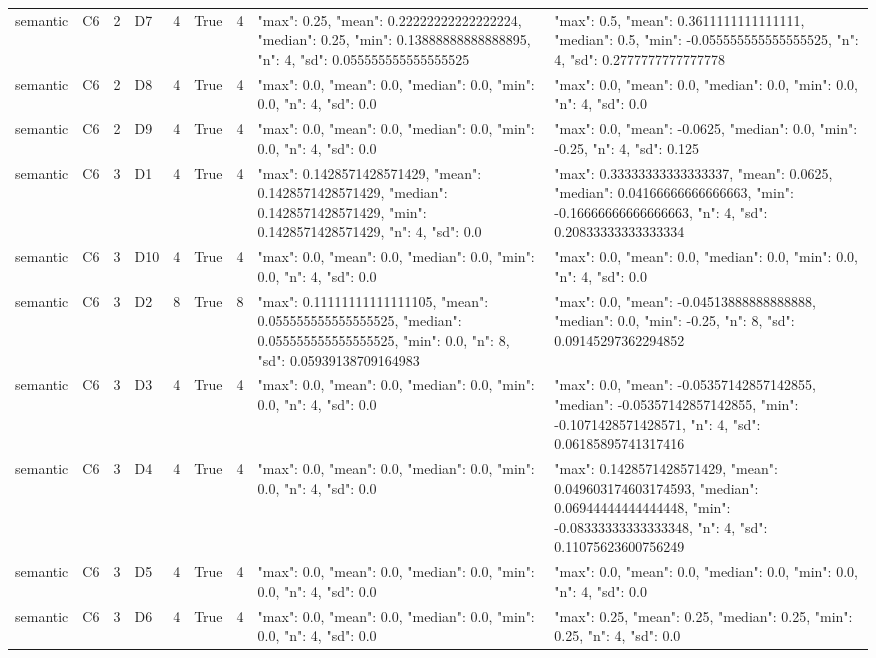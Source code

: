 \begin{tabular}{lllllllll}
semantic & C6 & 2 & D7 & 4 & True & 4 & {"max": 0.25, "mean": 0.22222222222222224, "median": 0.25, "min": 0.13888888888888895, "n": 4, "sd": 0.055555555555555525} & {"max": 0.5, "mean": 0.3611111111111111, "median": 0.5, "min": -0.055555555555555525, "n": 4, "sd": 0.2777777777777778} \\
semantic & C6 & 2 & D8 & 4 & True & 4 & {"max": 0.0, "mean": 0.0, "median": 0.0, "min": 0.0, "n": 4, "sd": 0.0} & {"max": 0.0, "mean": 0.0, "median": 0.0, "min": 0.0, "n": 4, "sd": 0.0} \\
semantic & C6 & 2 & D9 & 4 & True & 4 & {"max": 0.0, "mean": 0.0, "median": 0.0, "min": 0.0, "n": 4, "sd": 0.0} & {"max": 0.0, "mean": -0.0625, "median": 0.0, "min": -0.25, "n": 4, "sd": 0.125} \\
semantic & C6 & 3 & D1 & 4 & True & 4 & {"max": 0.1428571428571429, "mean": 0.1428571428571429, "median": 0.1428571428571429, "min": 0.1428571428571429, "n": 4, "sd": 0.0} & {"max": 0.33333333333333337, "mean": 0.0625, "median": 0.04166666666666663, "min": -0.16666666666666663, "n": 4, "sd": 0.20833333333333334} \\
semantic & C6 & 3 & D10 & 4 & True & 4 & {"max": 0.0, "mean": 0.0, "median": 0.0, "min": 0.0, "n": 4, "sd": 0.0} & {"max": 0.0, "mean": 0.0, "median": 0.0, "min": 0.0, "n": 4, "sd": 0.0} \\
semantic & C6 & 3 & D2 & 8 & True & 8 & {"max": 0.11111111111111105, "mean": 0.055555555555555525, "median": 0.055555555555555525, "min": 0.0, "n": 8, "sd": 0.05939138709164983} & {"max": 0.0, "mean": -0.04513888888888888, "median": 0.0, "min": -0.25, "n": 8, "sd": 0.09145297362294852} \\
semantic & C6 & 3 & D3 & 4 & True & 4 & {"max": 0.0, "mean": 0.0, "median": 0.0, "min": 0.0, "n": 4, "sd": 0.0} & {"max": 0.0, "mean": -0.05357142857142855, "median": -0.05357142857142855, "min": -0.1071428571428571, "n": 4, "sd": 0.06185895741317416} \\
semantic & C6 & 3 & D4 & 4 & True & 4 & {"max": 0.0, "mean": 0.0, "median": 0.0, "min": 0.0, "n": 4, "sd": 0.0} & {"max": 0.1428571428571429, "mean": 0.049603174603174593, "median": 0.06944444444444448, "min": -0.08333333333333348, "n": 4, "sd": 0.11075623600756249} \\
semantic & C6 & 3 & D5 & 4 & True & 4 & {"max": 0.0, "mean": 0.0, "median": 0.0, "min": 0.0, "n": 4, "sd": 0.0} & {"max": 0.0, "mean": 0.0, "median": 0.0, "min": 0.0, "n": 4, "sd": 0.0} \\
semantic & C6 & 3 & D6 & 4 & True & 4 & {"max": 0.0, "mean": 0.0, "median": 0.0, "min": 0.0, "n": 4, "sd": 0.0} & {"max": 0.25, "mean": 0.25, "median": 0.25, "min": 0.25, "n": 4, "sd": 0.0} \\

\end{tabular}
